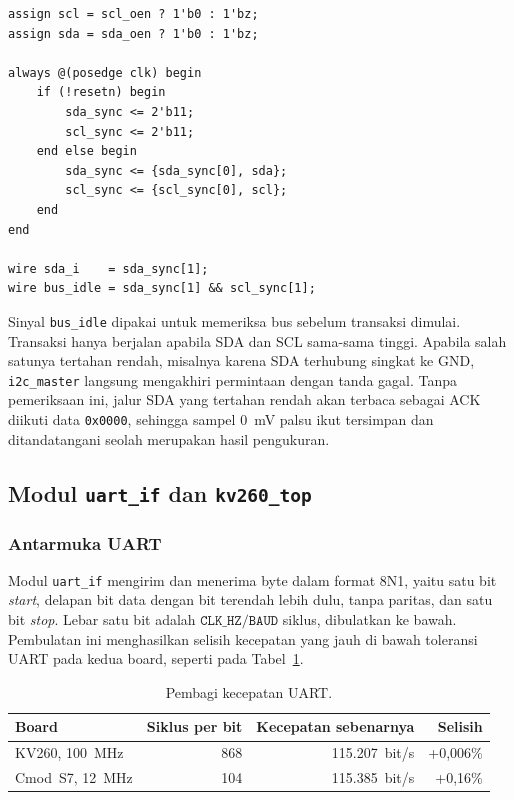 \documentclass[11pt,a4paper]{article}
\begin{document}
\noindent\begin{minipage}{\linewidth}
\begin{lstlisting}[caption={Jalur \textit{open-drain} dan sinkronisasi di \texttt{i2c\_master.v}
  (diringkas dari baris 75--96).}, label={lst:i2c}]
assign scl = scl_oen ? 1'b0 : 1'bz;
assign sda = sda_oen ? 1'b0 : 1'bz;

always @(posedge clk) begin
    if (!resetn) begin
        sda_sync <= 2'b11;
        scl_sync <= 2'b11;
    end else begin
        sda_sync <= {sda_sync[0], sda};
        scl_sync <= {scl_sync[0], scl};
    end
end

wire sda_i    = sda_sync[1];
wire bus_idle = sda_sync[1] && scl_sync[1];
\end{lstlisting}
\end{minipage}

Sinyal \texttt{bus\_idle} dipakai untuk memeriksa bus sebelum transaksi dimulai. Transaksi hanya
berjalan apabila SDA dan SCL sama-sama tinggi. Apabila salah satunya tertahan rendah, misalnya
karena SDA terhubung singkat ke GND, \texttt{i2c\_master} langsung mengakhiri permintaan dengan
tanda gagal. Tanpa pemeriksaan ini, jalur SDA yang tertahan rendah akan terbaca sebagai ACK
diikuti data \texttt{0x0000}, sehingga sampel 0~mV palsu ikut tersimpan dan ditandatangani seolah
merupakan hasil pengukuran.

\subsection{Modul \texttt{uart\_if} dan \texttt{kv260\_top}}
\label{subsec:uart}

\subsubsection*{Antarmuka UART}

Modul \texttt{uart\_if} mengirim dan menerima byte dalam format 8N1, yaitu satu bit
\textit{start}, delapan bit data dengan bit terendah lebih dulu, tanpa paritas, dan satu bit
\textit{stop}. Lebar satu bit adalah $\texttt{CLK\_HZ}/\texttt{BAUD}$ siklus, dibulatkan ke bawah.
Pembulatan ini menghasilkan selisih kecepatan yang jauh di bawah toleransi UART pada kedua board,
seperti pada Tabel~\ref{tab:baud}.

\begin{table}[H]
  \centering
  \small
  \begin{tabular}{l r r r}
    \toprule
    Board & Siklus per bit & Kecepatan sebenarnya & Selisih \\
    \midrule
    KV260, 100~MHz & 868 & 115.207~bit/s & +0,006\% \\
    Cmod~S7, 12~MHz & 104 & 115.385~bit/s & +0,16\% \\
    \bottomrule
  \end{tabular}
  \caption{Pembagi kecepatan UART.}
  \label{tab:baud}
\end{table}
\end{document}
